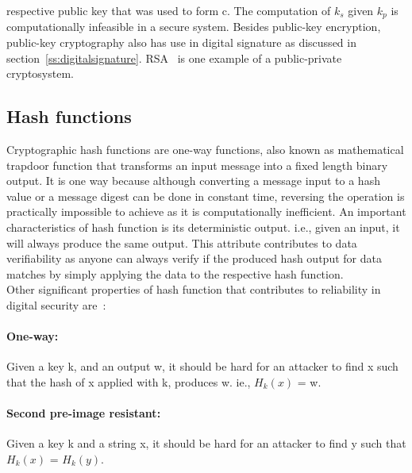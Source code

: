 respective public key that was used to form c. The computation of $k_{s}$ given
$k_{p}$ is computationally infeasible in a secure system. Besides public-key
encryption, public-key cryptography also has use in digital signature as
discussed in section~\ref{ss:digitalsignature}. RSA~\cite{rivest1978method} is
one example of a public-private cryptosystem.

\subsection{Hash functions}
Cryptographic hash functions are one-way functions, also known as mathematical
trapdoor function that transforms an input message into a fixed length binary
output. It is one way because although converting a message input to a hash
value or a message digest can be done in constant time, reversing the operation
is practically impossible to achieve as it is computationally inefficient. An
important characteristics of hash function is its deterministic output. i.e.,
given an input, it will always produce the same output. This attribute
contributes to data verifiability as anyone can always verify if the produced
hash output for data matches by simply applying the data to the respective hash
function. \\ 
Other significant properties of hash function that contributes to
reliability in digital security are~\cite{mironov2005hash}: 
\paragraph{One-way:} Given a key k, and an output w, it should be hard for an
attacker to find x such that the hash of x applied with k, produces w.  ie.,
$H_k(x)$ = w.
\paragraph{Second pre-image resistant:} Given a key k and a string x, it should
be hard for an attacker to find y such that $H_k(x)$ = $H_k(y)$. 
